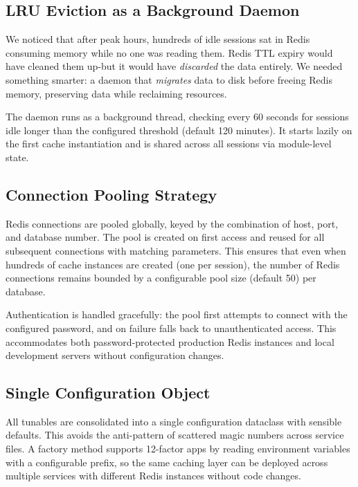 \documentclass[conference]{IEEEtran}
\begin{document}
\subsection{LRU Eviction as a Background Daemon}

We noticed that after peak hours, hundreds of idle sessions sat in Redis consuming memory while no one was reading them. Redis TTL expiry would have cleaned them up-but it would have \emph{discarded} the data entirely. We needed something smarter: a daemon that \emph{migrates} data to disk before freeing Redis memory, preserving data while reclaiming resources.

The daemon runs as a background thread, checking every 60 seconds for sessions idle longer than the configured threshold (default 120 minutes). It starts lazily on the first cache instantiation and is shared across all sessions via module-level state.

\subsection{Connection Pooling Strategy}

Redis connections are pooled globally, keyed by the combination of host, port, and database number. The pool is created on first access and reused for all subsequent connections with matching parameters. This ensures that even when hundreds of cache instances are created (one per session), the number of Redis connections remains bounded by a configurable pool size (default 50) per database.

Authentication is handled gracefully: the pool first attempts to connect with the configured password, and on failure falls back to unauthenticated access. This accommodates both password-protected production Redis instances and local development servers without configuration changes.

\subsection{Single Configuration Object}

All tunables are consolidated into a single configuration dataclass with sensible defaults. This avoids the anti-pattern of scattered magic numbers across service files. A factory method supports 12-factor apps by reading environment variables with a configurable prefix, so the same caching layer can be deployed across multiple services with different Redis instances without code changes.
\end{document}
